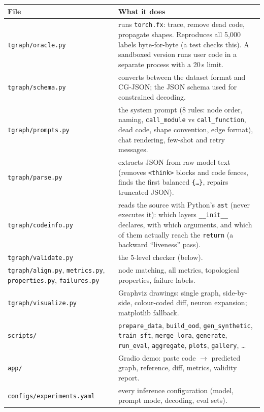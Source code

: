 \documentclass[11pt,a4paper]{article}
\begin{document}
\begin{center}\small
\begin{tabular}{p{4.1cm}p{11.3cm}}\toprule
File & What it does \\\midrule
\texttt{tgraph/oracle.py} & runs \texttt{torch.fx}: trace, remove dead code, propagate shapes. Reproduces all 5{,}000 labels byte-for-byte (a test checks this). A sandboxed version runs user code in a separate process with a 20\,s limit. \\
\texttt{tgraph/schema.py} & converts between the dataset format and CG-JSON; the JSON schema used for constrained decoding. \\
\texttt{tgraph/prompts.py} & the system prompt (8 rules: node order, naming, \texttt{call\_module} vs \texttt{call\_function}, dead code, shape convention, edge format), chat rendering, few-shot and retry messages. \\
\texttt{tgraph/parse.py} & extracts JSON from raw model text (removes \texttt{<think>} blocks and code fences, finds the first balanced \texttt{\{\dots\}}, repairs truncated JSON). \\
\texttt{tgraph/codeinfo.py} & reads the source with Python's \texttt{ast} (never executes it): which layers \texttt{\_\_init\_\_} declares, with which arguments, and which of them actually reach the \texttt{return} (a backward ``liveness'' pass). \\
\texttt{tgraph/validate.py} & the 5-level checker (below). \\
\raggedright \texttt{tgraph/align.py}, \texttt{metrics.py}, \texttt{properties.py}, \texttt{failures.py} & node matching, all metrics, topological properties, failure labels. \\
\texttt{tgraph/visualize.py} & Graphviz drawings: single graph, side-by-side, colour-coded diff, neuron expansion; matplotlib fallback. \\
\texttt{scripts/} & \texttt{prepare\_data}, \texttt{build\_ood}, \texttt{gen\_synthetic}, \texttt{train\_sft}, \texttt{merge\_lora}, \texttt{generate}, \texttt{run\_eval}, \texttt{aggregate}, \texttt{plots}, \texttt{gallery}, \dots \\
\texttt{app/} & Gradio demo: paste code $\to$ predicted graph, reference, diff, metrics, validity report. \\
\texttt{configs/}\allowbreak\texttt{experiments.yaml} & every inference configuration (model, prompt mode, decoding, eval sets). \\\bottomrule
\end{tabular}
\end{center}
\end{document}
